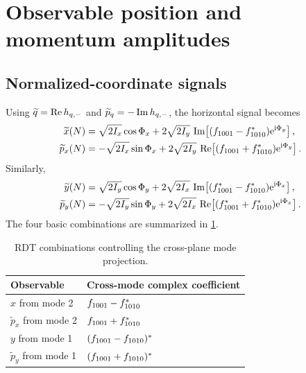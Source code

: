 \section{Observable position and momentum amplitudes}
\label{sec:observables}

\subsection{Normalized-coordinate signals}

Using $\widetilde q=\operatorname{Re} h_{q,-}$ and $\widetilde p_q=-\operatorname{Im} h_{q,-}$, the horizontal signal becomes
\begin{align}
 \widetilde x(N)
 &=\sqrt{2I_x}\cos\Phi_x
 +2\sqrt{2I_y}\,
 \operatorname{Im}\!\left[(f_{1001}-f_{1010}^{*})\mathrm{e}^{\mathrm{i}\Phi_y}\right],
 \label{eq:xtilde-rdt}\\
 \widetilde p_x(N)
 &=-\sqrt{2I_x}\sin\Phi_x
 +2\sqrt{2I_y}\,
 \operatorname{Re}\!\left[(f_{1001}+f_{1010}^{*})\mathrm{e}^{\mathrm{i}\Phi_y}\right].
 \label{eq:pxtilde-rdt}
\end{align}
Similarly,
\begin{align}
 \widetilde y(N)
 &=\sqrt{2I_y}\cos\Phi_y
 +2\sqrt{2I_x}\,
 \operatorname{Im}\!\left[(f_{1001}^{*}-f_{1010}^{*})\mathrm{e}^{\mathrm{i}\Phi_x}\right],
 \label{eq:ytilde-rdt}\\
 \widetilde p_y(N)
 &=-\sqrt{2I_y}\sin\Phi_y
 +2\sqrt{2I_x}\,
 \operatorname{Re}\!\left[(f_{1001}^{*}+f_{1010}^{*})\mathrm{e}^{\mathrm{i}\Phi_x}\right].
 \label{eq:pytilde-rdt}
\end{align}
The four basic combinations are summarized in \cref{tab:rdt-combinations}.

\begin{table}[htbp]
\centering
\caption{RDT combinations controlling the cross-plane mode projection.}
\label{tab:rdt-combinations}
\begin{tabular}{@{}ll@{}}
\toprule
Observable & Cross-mode complex coefficient\\
\midrule
$x$ from mode 2 & $f_{1001}-f_{1010}^{*}$\\
$\widetilde p_x$ from mode 2 & $f_{1001}+f_{1010}^{*}$\\
$y$ from mode 1 & $(f_{1001}-f_{1010})^{*}$\\
$\widetilde p_y$ from mode 1 & $(f_{1001}+f_{1010})^{*}$\\
\bottomrule
\end{tabular}
\end{table}

